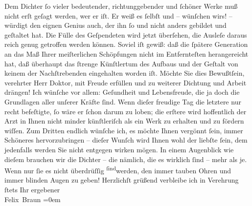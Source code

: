 \begin{ledgroupsized}[t]{13cm}
           \pstart
           {\pb}Dem Dichter ſo vieler bedeutender, richtunggebender
               und ſchöner Werke muß nicht erſt geſagt werden, wer er iſt. Er weiß es ſelbſt und –
               wünſchen wirs! – würdigt den eignen Genius auch, der ihn ſo und nicht anders gebildet
               und geſtaltet hat. Die Fülle des Geſpendeten wird jetzt überſehen, die Ausleſe daraus
               reich genug getroffen werden können. Soviel iſt gewiß: daß die ſpätere Generation an
               das Maß Ihrer meiſterlichen Schöpfungen nicht im Entfernteſten herangereicht hat, daß
               überhaupt das ſtrenge Künſtlertum des Aufbaus und der Geſtalt von keinem der
               Nachſtrebenden eingehalten worden iſt. Möchte Sie dies Bewußtſein, verehrter Herr
               Doktor, mit Freude erfüllen und zu weiterer Dichtung und Arbeit drängen!\pend
           \pstart
           Ich wünſche vor allem: Geſundheit und Lebensfreude, die ja doch die Grundlagen aller
               unſerer Kräfte ſind. Wenn dieſer freudige {\pb}Tag die
               letztere nur recht befeſtigte, ſo wäre er ſchon darum zu loben; die erſtere wird
               hoffentlich der Arzt in Ihnen nicht minder künſtleriſch als ein Werk zu erhalten und
               zu fördern wiſſen. Zum Dritten endlich wünſche ich, es möchte Ihnen vergönnt ſein,
               immer Schöneres hervorzubringen – dieſer Wunſch wird Ihnen wohl der liebſte ſein, dem
               jedenfalls werden Sie nicht entgegen wirken mögen. In einem Augenblick wie dieſem
               brauchen wir die Dichter – die nämlich, die es wirklich ſind – mehr als je. Wenn nur
               ſie es nicht überdrüſſig \substVorne{}\textsuperscript{ſind}\substDazwischen{}werden\substHinten{}, den immer tauben Ohren und immer blinden Augen zu geben!\pend
           \pstart
           Herzlichſt grüßend verbleibe ich in Verehrung ſtets Ihr ergebener{\\[\baselineskip]}\spacefill\mbox{Felix Braun}\pend
           \leftskip=0em{}
         
         \endnumbering{}\end{ledgroupsized}  \newcommand{\dateiname}{L02381}\newcommand{\titel}{Felix Braun an Arthur Schnitzler, 13. 5. 1922}\newcommand{\editorInnen}{Martin Anton Müller und Gerd-Hermann Susen}
      